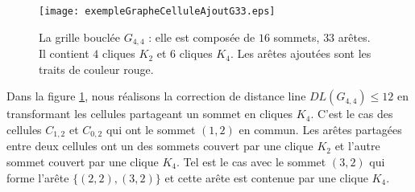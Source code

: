 \begin{figure}[htb!] 
\centering
\texttt{[image: exempleGrapheCelluleAjoutG33.eps]}
\caption{ La grille boucl\'ee $G_{4,4}$ : elle est compos\'ee de $16$ sommets, $33$ ar\^etes. Il contient $4$ cliques $K_{2}$ et $6$ cliques $K_4$. Les ar\^etes ajout\'ees sont les traits de couleur rouge.}
\label{exempleCorrectionGrapheCelluleAvecAjout}
\end{figure}
Dans la figure \ref{exempleCorrectionGrapheCelluleAvecAjout}, nous r\'ealisons la correction de distance line $DL(G_{4,4})  \le 12$ en transformant les cellules partageant un sommet en cliques $K_4$. C'est le cas des cellules $C_{1,2}$ et  $C_{0,2}$ qui ont le sommet $(1,2)$ en commun. 
Les ar\^etes partag\'ees entre deux cellules ont un des sommets couvert par une clique $K_2$ et l'autre sommet couvert par une clique $K_4$. Tel est le cas avec le sommet $(3,2)$ qui forme l'ar\^ete $\{(2,2),(3,2)\}$ et cette ar\^ete est contenue par une clique $K_4$.






